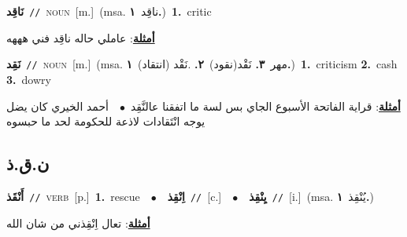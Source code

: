 \documentclass[10pt,a4paper,twoside]{article} %
\begin{document}
\begin{multicols}{2}
{\setlength\topsep{0pt}\textbf{\foreignlanguage{arabic}{نَاقِد}}\ {\color{gray}\texttt{//}\color{black}}\ \textsc{noun}\ [m.]\ \color{gray}(msa. \foreignlanguage{arabic}{ناقِد}~\foreignlanguage{arabic}{\textbf{١.}})\color{black}\ \textbf{1.}~critic\  \begin{flushright}\color{gray}\foreignlanguage{arabic}{\textbf{\underline{\foreignlanguage{arabic}{أمثلة}}}: عاملي حاله ناقِد فني هههه}\end{flushright}\color{black}} \vspace{2mm}

{\setlength\topsep{0pt}\textbf{\foreignlanguage{arabic}{نَقِد}}\ {\color{gray}\texttt{//}\color{black}}\ \textsc{noun}\ [m.]\ \color{gray}(msa. \foreignlanguage{arabic}{مهر}~\foreignlanguage{arabic}{\textbf{٣.}}  \foreignlanguage{arabic}{نَقْد(نقود)}~\foreignlanguage{arabic}{\textbf{٢.}}  .\foreignlanguage{arabic}{نَقْد (انتقاد)}~\foreignlanguage{arabic}{\textbf{١.}})\color{black}\ \textbf{1.}~criticism  \textbf{2.}~cash  \textbf{3.}~dowry\  \begin{flushright}\color{gray}\foreignlanguage{arabic}{\textbf{\underline{\foreignlanguage{arabic}{أمثلة}}}: قراية الفاتحة الأسبوع الجاي بس لسة ما اتفقنا عالنَّقِد\ $\bullet$\ \  أحمد الخيري كان يضل يوجه انْتَقادات لاذعة للحكومة لحد ما حبسوه}\end{flushright}\color{black}} \vspace{2mm}

\vspace{-3mm}
\subsection*{\color{blue}\foreignlanguage{arabic}{ن.ق.ذ}\color{blue}{}} 

{\setlength\topsep{0pt}\textbf{\foreignlanguage{arabic}{أَنْقَذ}}\ {\color{gray}\texttt{//}\color{black}}\ \textsc{verb}\ [p.]\ \textbf{1.}~rescue\ \ $\bullet$\ \ \setlength\topsep{0pt}\textbf{\foreignlanguage{arabic}{اِنْقِذ}}\ {\color{gray}\texttt{//}\color{black}}\ [c.]\ \ $\bullet$\ \ \setlength\topsep{0pt}\textbf{\foreignlanguage{arabic}{يِنْقِذ}}\ {\color{gray}\texttt{//}\color{black}}\ [i.]\ \color{gray}(msa. \foreignlanguage{arabic}{يُنْقِذ}~\foreignlanguage{arabic}{\textbf{١.}})\color{black}\  \begin{flushright}\color{gray}\foreignlanguage{arabic}{\textbf{\underline{\foreignlanguage{arabic}{أمثلة}}}: تعال اِنْقِذني من شان الله}\end{flushright}\color{black}} \vspace{2mm}


\end{multicols}
\end{document}
